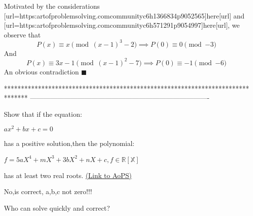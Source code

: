 \begin{solution}
	Motivated by the considerations [url=https:\/\/artofproblemsolving.com\/community\/c6h1366834p9052565]here[\/url] and [url=https:\/\/artofproblemsolving.com\/community\/c6h571291p9054997]here[\/url], we observe that
$$P(x)\equiv x\pmod{(x-1)^3-2}\implies P(0)\equiv 0\pmod{-3}$$
And
$$P(x)\equiv 3x-1\pmod{(x-1)^2-7}\implies P(0)\equiv -1\pmod{-6}$$
An obvious contradiction $\blacksquare$
\end{solution}
*******************************************************************************
-------------------------------------------------------------------------------

\begin{problem}
	Show that if the equation:

$ax^{2}+bx+c=0$

has a positive solution,then the polynomial:

$f=5aX^{4}+mX^{3}+3bX^{2}+nX+c,f\in\mathbb{R\left[X\right]}$ 

has at least two real roots.
	\flushright \href{https://artofproblemsolving.com/community/c6h1581671}{(Link to AoPS)}
\end{problem}






\begin{solution}
	No,is correct, a,b,c not zero!!!
\end{solution}



\begin{solution}
	Who can solve quickly and correct?
\end{solution}



